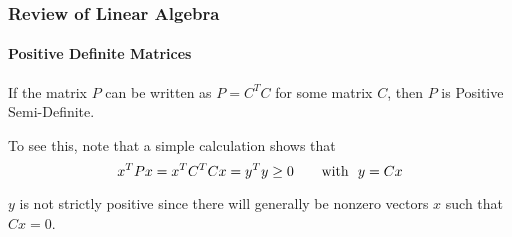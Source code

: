 \begin{frame}
\frametitle{Review of Linear Algebra}
\framesubtitle{Positive Definite Matrices}
\begin{remark}
If the matrix $P$ can be written as $P= C^TC$ for some matrix $C$, then $P$ is {\bor Positive
Semi-Definite}.
\end{remark}
To see this, note that a simple calculation shows that
$$
x^TPx = x^TC^TCx = y^Ty \ge 0 \qquad \mbox{\rm  with }\ y=Cx
$$

$y$ is not strictly positive since there will generally be {\bor nonzero vectors $x$} such
that $Cx = 0$.
\end{frame}


